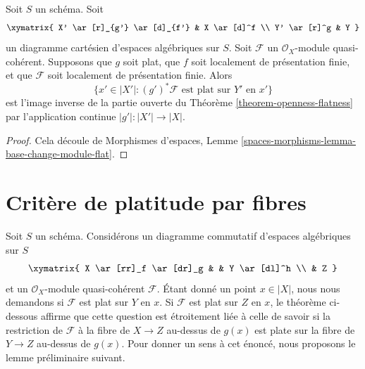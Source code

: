 \begin{lemma}
\label{lemma-flat-locus-base-change}
Soit $S$ un schéma. Soit
$$
\xymatrix{
X' \ar[r]_{g'} \ar[d]_{f'} & X \ar[d]^f \\
Y' \ar[r]^g & Y
}
$$
un diagramme cartésien d'espaces algébriques sur $S$.
Soit $\mathcal{F}$ un $\mathcal{O}_X$-module quasi-cohérent.
Supposons que $g$ soit plat, que $f$ soit localement de présentation finie,
et que $\mathcal{F}$ soit localement de présentation finie.
Alors
$$
\{x' \in |X'| : (g')^*\mathcal{F}\text{ est plat sur }Y'\text{ en }x'\}
$$
est l'image inverse de la partie ouverte du
Théorème \ref{theorem-openness-flatness}
par l'application continue $|g'| : |X'| \to |X|$.
\end{lemma}

\begin{proof}
Cela découle de
Morphismes d'espaces, Lemme
\ref{spaces-morphisms-lemma-base-change-module-flat}.
\end{proof}












\section{Crit\`ere de platitude par fibres}
\label{section-criterion-flat-fibres}

\noindent
Soit $S$ un schéma. Considérons un diagramme commutatif d'espaces algébriques
sur $S$
$$
\xymatrix{
X \ar[rr]_f \ar[dr]_g & & Y \ar[dl]^h \\
& Z
}
$$
et un $\mathcal{O}_X$-module quasi-cohérent $\mathcal{F}$.
Étant donné un point $x \in |X|$, nous nous demandons si
$\mathcal{F}$ est plat sur $Y$ en $x$. Si $\mathcal{F}$ est plat
sur $Z$ en $x$, le théorème ci-dessous affirme que cette question est
étroitement liée à celle de savoir si la restriction de
$\mathcal{F}$ à la fibre de $X \to Z$ au-dessus de $g(x)$
est plate sur la fibre de $Y \to Z$ au-dessus de $g(x)$. Pour donner un sens
à cet énoncé, nous proposons le lemme préliminaire suivant.

